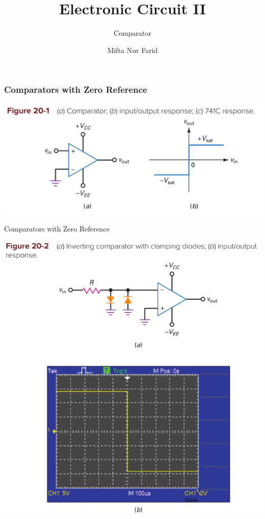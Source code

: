 \documentclass[pdflatex,compress]{beamer}
\title{Electronic Circuit II}
\subtitle{Comparator}
\author{Mifta Nur Farid}
\begin{document}
\maketitle

\begin{frame}
	\frametitle{Comparators with Zero Reference}
	\begin{center}
		\includegraphics[width=1\linewidth]{img/2001}
	\end{center}
\end{frame}

\begin{frame}{Comparators with Zero Reference}
	\begin{center}
		\includegraphics[height=0.9\textheight]{img/2002}
	\end{center}
\end{frame}
\end{document}
